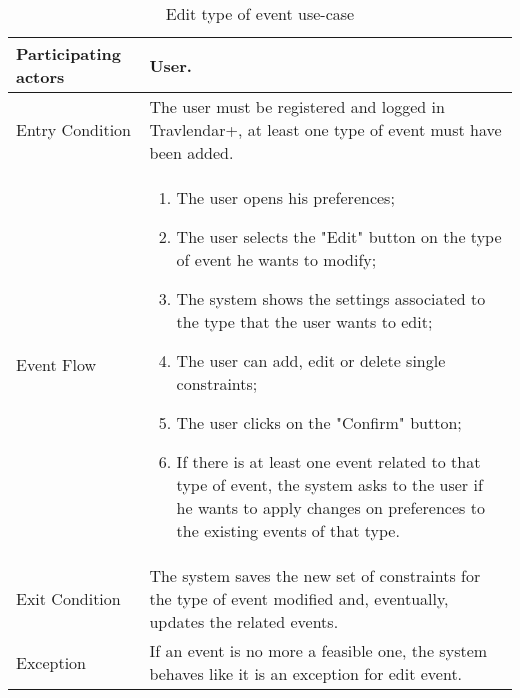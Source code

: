 \begin{table}[H]
	\begin{center}
		\begin{tabular}{ | p{} | p{} | }
		\hline
		Participating actors &  User.\\
		\hline
		Entry Condition & The user must be registered and logged in Travlendar+, at least one type of event must have been added.\\
		\hline
		Event Flow & 
			\begin{enumerate}
				\item The user opens his preferences;
				\item The user selects the "Edit" button on the type of event he wants to modify;
				\item The system shows the settings associated to the type that the user wants to edit;
				\item The user can add, edit or delete single constraints;
				\item The user clicks on the "Confirm" button;
				\item If there is at least one event related to that type of event, the system asks to the user if he wants to apply changes on preferences to the existing events of that type. 
			\end{enumerate} \\
		\hline
		Exit Condition & The system saves the new set of constraints for the type of event modified and, eventually, updates the related events. \\
		\hline
		Exception & If an event is no more a feasible one, the system behaves like it is an exception for edit event.\\ 
		\hline
		\end{tabular}
	\end{center}
	\caption{Edit type of event use-case}
\end{table}